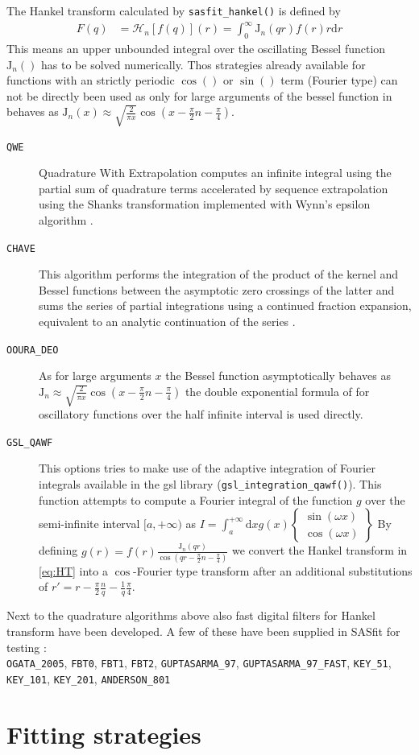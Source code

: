 The Hankel transform calculated by \texttt{sasfit\_hankel()} is defined by
\begin{align}\label{eq:HT}
F(q) &= \mathcal{H}_n\left[f(q)\right](r)  = \int_0^\infty \mathrm{J}_n(qr) f(r) r \mathrm{d}r
\end{align}
This means an upper unbounded integral over the oscillating Bessel function $\mathrm{J}_n()$ has to be solved numerically.
Thos strategies already available for functions with an strictly periodic $\cos()$ or $\sin()$ term (Fourier type) can not be directly been used as only for large arguments of the bessel function in behaves as $\mathrm{J}_n(x)\approx \sqrt{\frac{2}{\pi x}}\cos\left(x-\frac{\pi}{2}n-\frac{\pi}{4}\right)$.
\begin{description}
\item[\texttt{QWE}] Quadrature With Extrapolation computes an
infinite integral using the partial sum of quadrature terms
accelerated by sequence extrapolation using the Shanks transformation
implemented with Wynn's epsilon algorithm \cite{Key2012}.
\item[\texttt{CHAVE}]  This algorithm performs the integration of the product of the kernel and Bessel functions between the asymptotic zero crossings of the latter and sums the series of partial integrations using a continued fraction expansion, equivalent to an analytic continuation of the series \cite{Chave1983}.
\item[\texttt{OOURA\_DEO}] As for large arguments $x$ the Bessel function asymptotically behaves as
$\mathrm{J}_n\approx \sqrt{\frac{2}{\pi x}}\cos\left(x-\frac{\pi}{2}n-\frac{\pi}{4}\right)$ the double exponential formula of \cite{Ooura_1991} for oscillatory functions over the half infinite interval is used directly.
\item[\texttt{GSL\_QAWF}] This options tries to make use of the adaptive integration of Fourier integrals available in the gsl library (\texttt{gsl\_integration\_qawf()}). This function attempts to compute a Fourier integral of the function $g$ over the semi-infinite interval $[a,+\infty)$ as
$I = \int_a^{+\infty} \mathrm{d}x g(x)
\left\{
\begin{array}{c}
\sin{(\omega x)} \\
\cos{(\omega x)}
\end{array}
\right\}$
By defining $g(r)= f(r) \frac{\mathrm{J}_n(qr)}{\cos\left(qr-\frac{\pi}{2}n-\frac{\pi}{4}\right)}$ we convert the Hankel transform in \ref{eq:HT} into a $\cos$-Fourier type transform after an additional substitutions of $r'=r-\frac{\pi}{2}\frac{n}{q}-\frac{1}{q}\frac{\pi}{4}$.
\end{description}
Next to the quadrature algorithms above also fast digital filters for Hankel transform have been developed. A few of these have been supplied in SASfit for testing \cite{Anderson1989,Guptasarma1997,Ogata2005,Kong2007,Key2012,Kang2021}: \\
\texttt{OGATA\_2005}, \texttt{FBT0}, \texttt{FBT1}, \texttt{FBT2}, \texttt{GUPTASARMA\_97}, \texttt{GUPTASARMA\_97\_FAST}, \texttt{KEY\_51}, \texttt{KEY\_101}, \texttt{KEY\_201}, \texttt{ANDERSON\_801}



\clearpage
\section{Fitting strategies}
